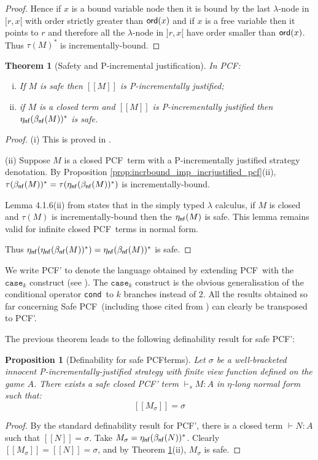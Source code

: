\documentclass{article}
\newcommand{\sem}[1]{{[\![ #1 ]\!]}}
\newcommand\pcf{\textsf{PCF}}
\newcommand\pcfcond{\texttt{cond}}
\newcommand\pcfcase{\texttt{case}} %
\def\etanf#1{\eta_{\sf nf}(#1)}
\def\betanf#1{\beta_{\sf nf}(#1)}
\newcommand{\ord}[1]{{\sf ord}(#1)}
\newtheorem{theorem}{Theorem}[section]
\newtheorem{proposition}{Proposition}[section]
\theoremstyle{remark}
\theoremstyle{definition}
\begin{document}
\begin{proof}
Hence if $x$ is a bound variable node then it is bound by the
last $\lambda$-node in $[r,x[$ with order strictly greater than
$\ord{x}$ and if $x$ is a free variable then it points to $r$ and
therefore all the $\lambda$-node in $]r,x[$ have order smaller than
$\ord{x}$. Thus $\tau(M)^*$ is incrementally-bound.

\end{proof}

\begin{theorem}[Safety and P-incremental justification]
\label{thm:safeincrejust_pcf} In \pcf:
\begin{enumerate}[(i)]
\item If $M$ is safe then $\sem{M}$ is P-incrementally justified;
\item if $M$ is a closed term and $\sem{M}$ is
  P-incrementally justified then $\etanf{\betanf{M}}^*$ is safe.
\end{enumerate}
\end{theorem}
\begin{proof}
\noindent(i)
This is proved in  \cite[Theorem 4.2.10]{blumtransfer}.

\noindent(ii) Suppose $M$ is a closed \pcf\ term with a P-incrementally justified strategy denotation. By Proposition \ref{prop:incrbound_imp_incrjustified_pcf}(ii), $\tau(\betanf{M})^* = \tau(\etanf{\betanf{M}}^*)$ is incrementally-bound.

Lemma 4.1.6(ii) from \cite{blumtransfer} states that in the simply typed $\lambda$ calculus, if $M$ is closed and $\tau(M)$ is incrementally-bound then the $\etanf{M}$ is safe.
This lemma remains valid for infinite closed \pcf\ terms in normal form.

Thus $\etanf{\etanf{\betanf{M}}^*} = \etanf{\betanf{M}}^*$ is safe.
\end{proof}


We write \pcf' to denote the language obtained by extending \pcf\
with the $\pcfcase_k$ construct (see \cite{Abr02}).
The $\pcfcase_k$ construct is the obvious generalisation of the
conditional operator \pcfcond\ to $k$ branches instead of $2$. All the results obtained so far concerning Safe \pcf\ (including those
cited from \cite{blumtransfer}) can clearly be transposed to \pcf'.

The previous theorem leads to the following definability result for safe \pcf':
\begin{proposition}[Definability for safe \pcf\' terms]
\label{prop:safetydefinability}
Let $\sigma$ be a well-bracketed innocent
P-incrementally-justified strategy with finite view function defined on the game $A$. There exists a \emph{safe} closed PCF' term $\vdash_s M : A$ in $\eta$-long normal form such that:
$$ \sem{M_\sigma} = \sigma $$
\end{proposition}
\begin{proof}
By the standard definability result for PCF', there is a closed term $\vdash N : A$ such that $\sem{N} = \sigma$.
Take $M_\sigma = \etanf{\betanf{N}}^*$.
Clearly $\sem{ M_\sigma} = \sem{N} = \sigma$, and by Theorem \ref{thm:safeincrejust_pcf}(ii), $M_\sigma$ is safe.
\end{proof}
\end{document}
